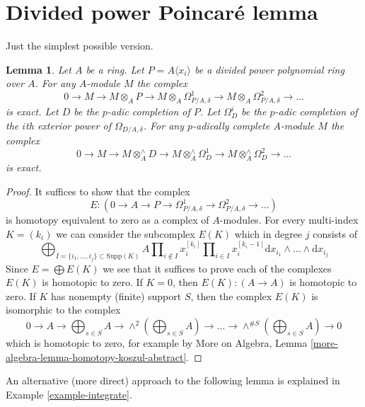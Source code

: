 \documentclass{stacks-project}
\theoremstyle{plain}
\newtheorem{lemma}[subsection]{Lemma}
\theoremstyle{definition}
\theoremstyle{remark}
\numberwithin{equation}{subsection}
\begin{document}
\section{Divided power Poincar\'e lemma}
\label{section-poincare}

\noindent
Just the simplest possible version.

\begin{lemma}
\label{lemma-poincare}
Let $A$ be a ring. Let $P = A\langle x_i \rangle$ be a divided
power polynomial ring over $A$. For any $A$-module $M$ the complex
$$
0 \to M \to
M \otimes_A P \to
M \otimes_A \Omega^1_{P/A, \delta} \to
M \otimes_A \Omega^2_{P/A, \delta} \to \ldots
$$
is exact. Let $D$ be the $p$-adic completion of $P$.
Let $\Omega^i_D$ be the $p$-adic completion of the $i$th exterior
power of $\Omega_{D/A, \delta}$. For any $p$-adically complete
$A$-module $M$ the complex
$$
0 \to M \to
M \otimes^\wedge_A D \to
M \otimes^\wedge_A \Omega^1_D \to
M \otimes^\wedge_A \Omega^2_D \to \ldots
$$
is exact.
\end{lemma}

\begin{proof}
It suffices to show that the complex
$$
E :
(0 \to A \to P \to \Omega^1_{P/A, \delta} \to
\Omega^2_{P/A, \delta} \to \ldots)
$$
is homotopy equivalent to zero as a complex of $A$-modules.
For every multi-index $K = (k_i)$ we can consider the subcomplex $E(K)$
which in degree $j$ consists of
$$
\bigoplus\nolimits_{I = \{i_1, \ldots, i_j\} \subset \text{Supp}(K)}
A
\prod\nolimits_{i \not \in I} x_i^{[k_i]}
\prod\nolimits_{i \in I} x_i^{[k_i - 1]}
\text{d}x_{i_1} \wedge \ldots \wedge \text{d}x_{i_j}
$$
Since $E = \bigoplus E(K)$ we see that it suffices to prove each of the
complexes $E(K)$ is homotopic to zero. If $K = 0$, then
$E(K) : (A \to A)$ is homotopic to zero. If $K$ has nonempty (finite)
support $S$, then the complex $E(K)$ is isomorphic to the complex
$$
0 \to A \to
\bigoplus\nolimits_{s \in S} A \to
\wedge^2(\bigoplus\nolimits_{s \in S} A) \to
\ldots \to \wedge^{\# S}(\bigoplus\nolimits_{s \in S} A) \to 0
$$
which is homotopic to zero, for example by
More on Algebra, Lemma \ref{more-algebra-lemma-homotopy-koszul-abstract}.
\end{proof}

\noindent
An alternative (more direct) approach to the following lemma is
explained in Example \ref{example-integrate}.
\end{document}
